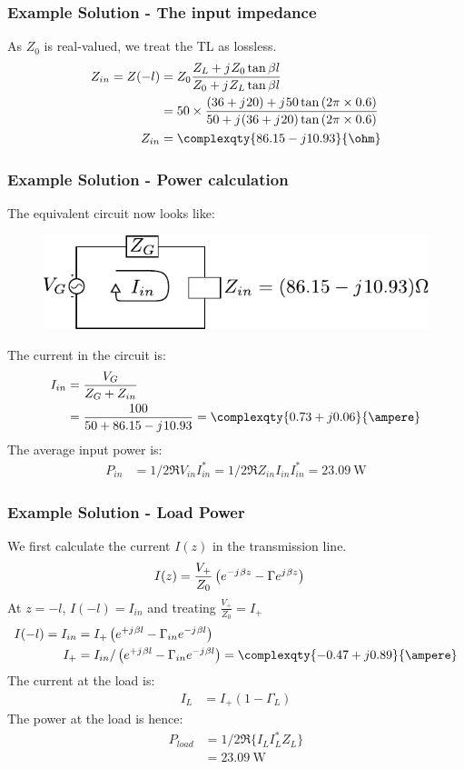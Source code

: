 \documentclass[10pt, compress]{beamer}
\renewcommand{\j}{{j}\mkern1mu} %
\begin{document}
\begin{frame}
  \frametitle{Example Solution - The input impedance}

  As $Z_0$ is real-valued, we treat the TL as lossless.
  \begin{align*}
    Z_{in} = Z(-l) &= Z_0 \frac{Z_L + \j Z_0 \tan{\beta l}}{Z_0 + \j Z_L \tan{\beta l}}  \\
    &= 50 \times \frac{(36 + \j 20) + \j 50 \tan{(2 \pi \times 0.6)}}{50 +  \j (36 + \j 20) \tan{(2 \pi \times 0.6)}} \\
    Z_{in}&= \complexqty{86.15 - j10.93}{\ohm}
  \end{align*}

  
\end{frame}
\begin{frame}
  \frametitle{Example Solution - Power calculation}

  The equivalent circuit now looks like:
  \begin{figure}[H!]
    \centering
    \includegraphics[width=.6\textwidth]{tline_terminated_example_power.pdf}
  \end{figure}
  The current in the circuit is:
  \begin{align*}
    I_{in} &= \frac{V_G}{Z_G + Z_{in}} \\
    &= \frac{100}{50 + 86.15 - \j 10.93} = \complexqty{0.73 + j 0.06}{\ampere}
  \end{align*}
  The average input power is:
  \begin{align*}
    P_{in} &= 1/2 \Re{V_{in} I_{in}^*} = 1/2 \Re{Z_{in} I_{in} I_{in}^*} = \SI{23.09}{\watt} 
  \end{align*}

\end{frame}
\begin{frame}
  \frametitle{Example Solution - Load Power}
We first calculate the current $I(z)$ in the transmission line.
\begin{align*}
  I(z) &= \frac{V_{+}}{Z_0} \left( e^{-\j \beta z} - \Gamma e^{\j \beta z}\right) 
\end{align*}
At $z = -l$, $I(-l) = I_{in}$ and treating $\frac{V_{+}}{Z_0} = I_{+}$
\begin{align*}
  I(-l) = I_{in} &= I_{+} \left( e^{+\j \beta l} - \Gamma_{in} e^{-\j \beta l}\right) \\
  I_{+} &= I_{in}/\left( e^{+\j \beta l} - \Gamma_{in} e^{-\j \beta l}\right)  = \complexqty{-0.47 + j 0.89}{\ampere}
\end{align*}
The current at the load is:
\begin{align*}
  I_L &= I_{+}(1 - \Gamma_L)
\end{align*}
The power at the load is hence:
\begin{align*}
  P_{load} &= 1/2 \Re\{I_{L} I_{L }^*Z_L\} \\
    &= \SI{23.09}{\watt}
\end{align*}
\end{frame}
\end{document}

